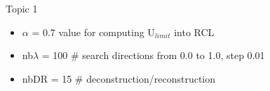 \documentclass[10pt,xcolor=dvipsnames]{beamer}
\begin{document}
\begin{frame}{Topic 1}
{\small 
\begin{itemize}
\item $\alpha$ = 0.7 \hfill value for computing U$_{limit}$ into RCL\vspace{-1mm}

\item nb$\lambda$ = 100 \hfill \# search directions from 0.0 to 1.0, step 0.01\vspace{-1mm}

\item nbDR = 15 \hfill \# deconstruction/reconstruction
\end{itemize}
} 

\end{frame}

%
%
%
%
%
%
%
\end{document}
